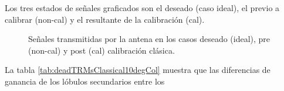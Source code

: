 Los tres estados de señales graficados son el deseado (caso ideal), el previo a calibrar (non-cal) y el resultante de la
calibración (cal).
\begin{figure}[H]
	\centering

	\caption{Señales transmitidas por la antena en los casos deseado (ideal), pre (non-cal) y post (cal) calibración clásica.}
	\label{fig:deadTRMsClassical10degCol}
\end{figure}
La tabla \ref{tab:deadTRMsClassical10degCol} muestra que las diferencias de ganancia de los lóbulos secundarios entre los 
